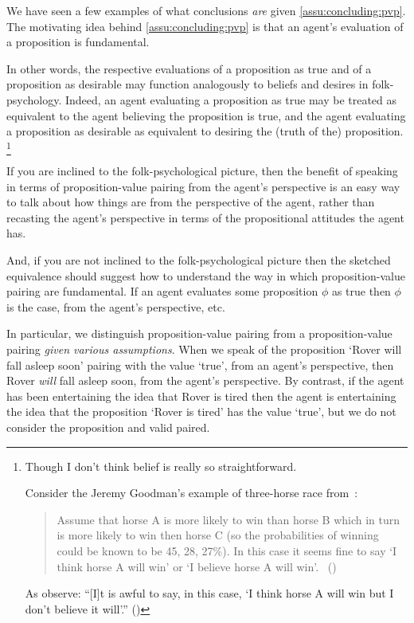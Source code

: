 \begin{note}
  We have seen a few examples of what conclusions \emph{are} given \autoref{assu:concluding:pvp}.
  The motivating idea behind \autoref{assu:concluding:pvp} is that an agent's evaluation of a proposition is fundamental.

  In other words, the respective evaluations of a proposition as true and of a proposition as desirable may function analogously to beliefs and desires in folk-psychology.
  Indeed, an agent evaluating a proposition as true may be treated as equivalent to the agent believing the proposition is true, and the agent evaluating a proposition as desirable as equivalent to desiring the (truth of the) proposition.%
  \footnote{
    \label{fn:belief-is-difficult}
    Though I don't think belief is really so straightforward.

    Consider the Jeremy Goodman's example of three-horse race from~\textcite{Hawthorne:2016wv}:
    \begin{quote}
      Assume that horse A is more likely to win than horse B which in turn is more likely to win then horse C (so the probabilities of winning could be known to be 45, 28, 27\%).
      In this case it seems ﬁne to say `I think horse A will win' or `I believe horse A will win'.%
      \mbox{ }\hfill\mbox{(\citeyear[1440]{Hawthorne:2016wv})}
    \end{quote}
    As \citeauthor{Hawthorne:2016wv} observe: ``[I]t is awful to say, in this case, `I think horse A will win but I don't believe it will'.''
    (\citeyear[1440, fn.17]{Hawthorne:2016wv})
  }

  If you are inclined to the folk-psychological picture, then the benefit of speaking in terms of proposition-value pairing from the agent's perspective is an easy way to talk about how things are from the perspective of the agent, rather than recasting the agent's perspective in terms of the propositional attitudes the agent has.

  And, if you are not inclined to the folk-psychological picture then the sketched equivalence should suggest how to understand the way in which proposition-value pairing are fundamental.
  If an agent evaluates some proposition \(\phi\) as true then \(\phi\) is the case, from the agent's perspective, etc.
\end{note}

\begin{note}
  In particular, we distinguish proposition-value pairing from a proposition-value pairing \emph{given various assumptions}.
  When we speak of the proposition `Rover will fall asleep soon' pairing with the value `true', from an agent's perspective, then Rover \emph{will} fall asleep soon, from the agent's perspective.
  By contrast, if the agent has been entertaining the idea that Rover is tired then the agent is entertaining the idea that the proposition `Rover is tired' has the value `true', but we do not consider the proposition and valid paired.
\end{note}

